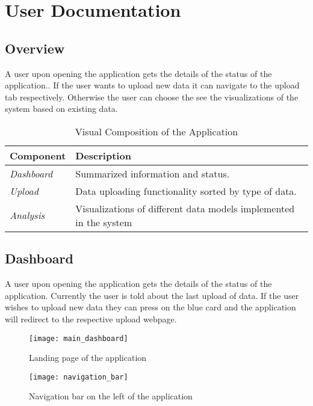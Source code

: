 \chapter{User Documentation} %
\label{ch:user}

\section{Overview}

A user upon opening the application gets the details of the status of the application..
If the user wants to upload new data it can navigate to the upload tab respectively. Otherwise the user 
can choose the see the visualizations of the system based on existing data.

\begin{table}[H]
	\centering
	\begin{tabular}{ | m{} | m{} | }
		\hline
		\textbf{Component} & \textbf{Description} \\
		\hline \hline
		\emph{Dashboard} & Summarized information and status. \\
		\hline
		\emph{Upload} & Data uploading functionality sorted by type of data. \\
		\hline
		\emph{Analysis} & Visualizations of different data models implemented in the system \\
		\hline
	\end{tabular}
	\caption{Visual Composition of the Application}
	\label{tab:overall}
\end{table}

\section{Dashboard}

A user upon opening the application gets the details of the status of the application.
Currently the user is told about the last upload of data. If the user wishes to upload new
data they can press on the blue card and the application will redirect to the respective upload
webpage.

\begin{figure}[H]
	\centering
	\texttt{[image: main\_dashboard]}
	\caption{Landing page of the application}
	\label{fig:example-1}
\end{figure}

\begin{figure}[H]
	\centering
	\texttt{[image: navigation\_bar]}
	\caption{Navigation bar on the left of the application}
	\label{fig:navigation}
\end{figure}

